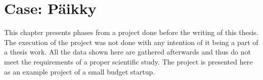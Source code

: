 
 \chapter{Case: Päikky}

This chapter presents phases from a project done before the writing of this thesis. The execution of the project was not done with any intention of it being a part of a thesis work. All the data shown here are gathered afterwards and thus do not meet the requirements of a proper scientific study. The project is presented here as an example project of a small budget startup.




